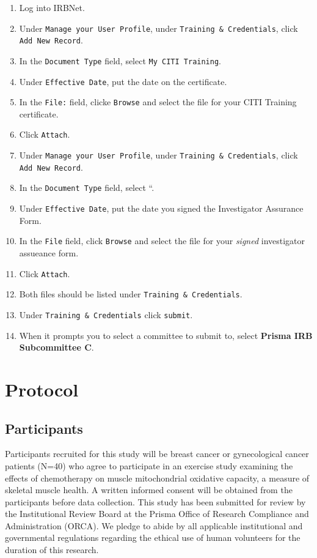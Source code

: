 \documentclass[
]{book}
\providecommand{\tightlist}{%
  \setlength{\itemsep}{0pt}\setlength{\parskip}{0pt}}
\begin{document}
\begin{enumerate}
\def\labelenumi{\arabic{enumi}.}
\tightlist
\item
  Log into IRBNet.
\item
  Under \texttt{Manage\ your\ User\ Profile}, under \texttt{Training\ \&\ Credentials}, click \texttt{Add\ New\ Record}.
\item
  In the \texttt{Document\ Type} field, select \texttt{My\ CITI\ Training}.
\item
  Under \texttt{Effective\ Date}, put the date on the certificate.
\item
  In the \texttt{File:} field, clicke \texttt{Browse} and select the file for your CITI Training certificate.
\item
  Click \texttt{Attach}.
\item
  Under \texttt{Manage\ your\ User\ Profile}, under \texttt{Training\ \&\ Credentials}, click \texttt{Add\ New\ Record}.
\item
  In the \texttt{Document\ Type} field, select ``.
\item
  Under \texttt{Effective\ Date}, put the date you signed the Investigator Assurance Form.
\item
  In the \texttt{File} field, click \texttt{Browse} and select the file for your \emph{signed} investigator assueance form.
\item
  Click \texttt{Attach}.
\item
  Both files should be listed under \texttt{Training\ \&\ Credentials}.
\item
  Under \texttt{Training\ \&\ Credentials} click \texttt{submit}.
\item
  When it prompts you to select a committee to submit to, select \textbf{Prisma IRB Subcommittee C}.
\end{enumerate}

\hypertarget{IRB-Protocol}{%
\section{Protocol}\label{IRB-Protocol}}

\hypertarget{Appendix-IRB-Protocol-Participants}{%
\subsection{Participants}\label{Appendix-IRB-Protocol-Participants}}

Participants recruited for this study will be breast cancer or gynecological cancer patients (N=40) who agree to participate in an exercise study examining the effects of chemotherapy on muscle mitochondrial oxidative capacity, a measure of skeletal muscle health. A written informed consent will be obtained from the participants before data collection. This study has been submitted for review by the Institutional Review Board at the Prisma Office of Research Compliance and Administration (ORCA). We pledge to abide by all applicable institutional and governmental regulations regarding the ethical use of human volunteers for the duration of this research.
\end{document}
